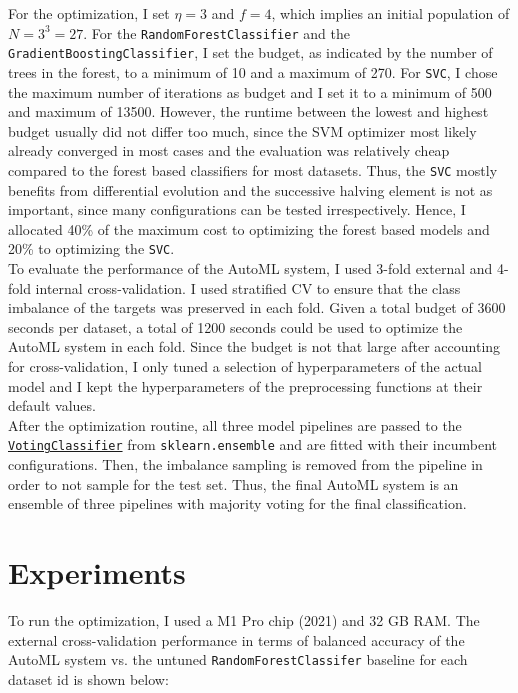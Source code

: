 \documentclass[11pt]{article}
\begin{document}
For the optimization, I set $\eta=3$ and $f=4$, which implies an initial population of $N=3^{3}=27$. For the \texttt{RandomForestClassifier} and the \texttt{GradientBoostingClassifier}, I set the budget, as indicated by the number of trees in the forest, to a minimum of 10 and a maximum of 270. For \texttt{SVC}, I chose the maximum number of iterations as budget and I set it to a minimum of 500 and maximum of 13500. However, the runtime between the lowest and highest budget usually did not differ too much, since the SVM optimizer most likely already converged in most cases and the evaluation was relatively cheap compared to the forest based classifiers for most datasets. Thus, the \texttt{SVC} mostly benefits from differential evolution and the successive halving element is not as important, since many configurations can be tested irrespectively. Hence, I allocated 40\% of the maximum cost to optimizing the forest based models and 20\% to optimizing the \texttt{SVC}. \\

To evaluate the performance of the AutoML system, I used 3-fold external and 4-fold internal cross-validation. I used stratified CV to ensure that the class imbalance of the targets was preserved in each fold. Given a total budget of 3600 seconds per dataset, a total of 1200 seconds could be used to optimize the AutoML system in each fold. Since the budget is not that large after accounting for cross-validation, I only tuned a selection of hyperparameters of the actual model and I kept the hyperparameters of the preprocessing functions at their default values. \\

After the optimization routine, all three model pipelines are passed to the \href{https://scikit-learn.org/stable/modules/generated/sklearn.ensemble.VotingClassifier.html}{\texttt{VotingClassifier}} from \texttt{sklearn.ensemble} and are fitted with their incumbent configurations. Then, the imbalance sampling is removed from the pipeline in order to not sample for the test set. Thus, the final AutoML system is an ensemble of three pipelines with majority voting for the final classification. 

\section{Experiments}

To run the optimization, I used a M1 Pro chip (2021) and 32 GB RAM. The external cross-validation performance in terms of balanced accuracy of the AutoML system vs. the untuned \texttt{RandomForestClassifer} baseline for each dataset id is shown below:
\end{document}
